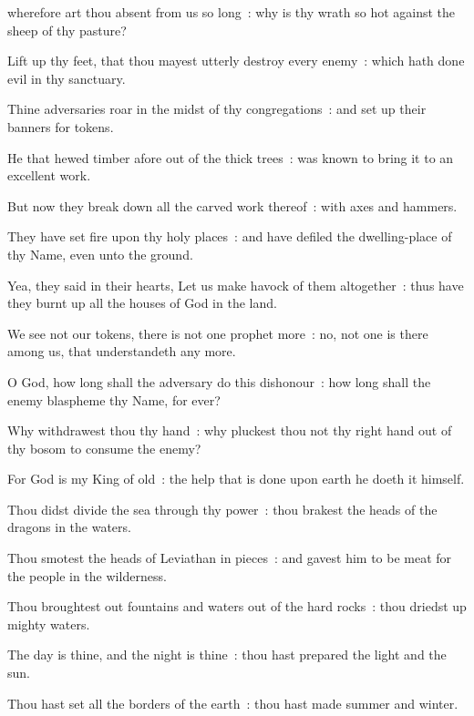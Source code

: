  wherefore art thou absent from us so long~: why is thy wrath so hot against the sheep of thy pasture?\par
{}
Lift up thy feet, that thou mayest utterly destroy every enemy~: which hath done evil in thy sanctuary.\par
{}Thine adversaries roar in the midst of thy congregations~: and set up their banners for tokens.\par
{}He that hewed timber afore out of the thick trees~: was known to bring it to an excellent work.\par
{}But now they break down all the carved work thereof~: with axes and hammers.\par
{}They have set fire upon thy holy places~: and have defiled the dwelling-place of thy Name, even unto the ground.\par
{}Yea, they said in their hearts, Let us make havock of them altogether~: thus have they burnt up all the houses of God in the land.\par
{}We see not our tokens, there is not one prophet more~: no, not one is there among us, that understandeth any more.\par
{}O God, how long shall the adversary do this dishonour~: how long shall the enemy blaspheme thy Name, for ever?\par
{}Why withdrawest thou thy hand~: why pluckest thou not thy right hand out of thy bosom to consume the enemy?\par
{}For God is my King of old~: the help that is done upon earth he doeth it himself.\par
{}Thou didst divide the sea through thy power~: thou brakest the heads of the dragons in the waters.\par
{}Thou smotest the heads of Leviathan in pieces~: and gavest him to be meat for the people in the wilderness.\par
{}Thou broughtest out fountains and waters out of the hard rocks~: thou driedst up mighty waters.\par
{}The day is thine, and the night is thine~: thou hast prepared the light and the sun.\par
{}Thou hast set all the borders of the earth~: thou hast made summer and winter.\par
